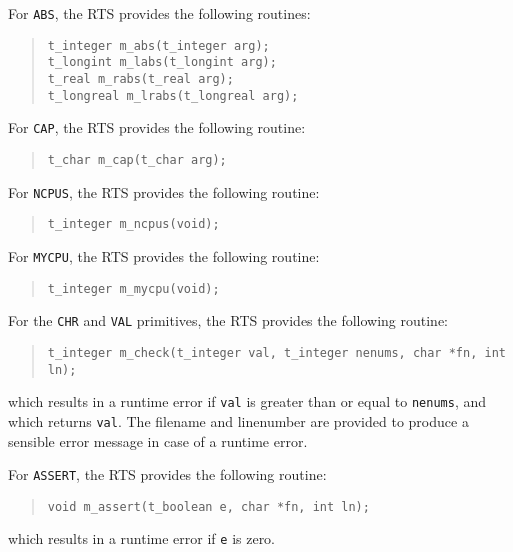 \documentclass[10pt]{article}
\begin{document}
For \verb+ABS+, the RTS provides the following routines:
\begin{quote}
\begin{verbatim}
t_integer m_abs(t_integer arg);
t_longint m_labs(t_longint arg);
t_real m_rabs(t_real arg);
t_longreal m_lrabs(t_longreal arg);
\end{verbatim}
\end{quote}

For \verb+CAP+, the RTS provides the following routine:
\begin{quote}
\begin{verbatim}
t_char m_cap(t_char arg);
\end{verbatim}
\end{quote}

For \verb+NCPUS+, the RTS provides the following routine:
\begin{quote}
\begin{verbatim}
t_integer m_ncpus(void);
\end{verbatim}
\end{quote}

For \verb+MYCPU+, the RTS provides the following routine:
\begin{quote}
\begin{verbatim}
t_integer m_mycpu(void);
\end{verbatim}
\end{quote}

For the \verb+CHR+ and \verb+VAL+ primitives, the RTS provides the
following routine:
\begin{quote}
\begin{verbatim}
t_integer m_check(t_integer val, t_integer nenums, char *fn, int ln);
\end{verbatim}
\end{quote}
which results in a runtime error if \verb+val+ is greater than or equal to
\verb+nenums+, and which returns \verb+val+.
The filename and linenumber are provided to produce a sensible error message
in case of a runtime error.

For \verb+ASSERT+, the RTS provides the following routine:
\begin{quote}
\begin{verbatim}
void m_assert(t_boolean e, char *fn, int ln);
\end{verbatim}
\end{quote}
which results in a runtime error if \verb+e+
is zero.
\end{document}
